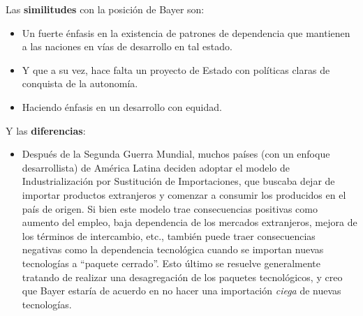  Las \textbf{similitudes} con la posición de Bayer son:

 \begin{itemize}
     \item Un fuerte énfasis en la existencia de patrones de dependencia que mantienen a las naciones en vías de desarrollo en tal estado.
     \item Y que a su vez, hace falta un proyecto de Estado con políticas claras de conquista de la autonomía.
     \item Haciendo énfasis en un desarrollo con equidad.
 \end{itemize}

 Y las \textbf{diferencias}:

 \begin{itemize}
     \item Después de la Segunda Guerra Mundial, muchos países (con un enfoque desarrollista) de América Latina deciden adoptar el modelo de Industrialización por Sustitución de Importaciones, que buscaba dejar de importar productos extranjeros y comenzar a consumir los producidos en el país de origen. Si bien este modelo trae consecuencias positivas como aumento del empleo, baja dependencia de los mercados extranjeros, mejora de los términos de intercambio, etc., también puede traer consecuencias negativas como la dependencia tecnológica cuando se importan nuevas tecnologías a ``paquete cerrado''. Esto último se resuelve generalmente tratando de realizar una desagregación de los paquetes tecnológicos, y creo que Bayer estaría de acuerdo en no hacer una importación \textit{ciega} de nuevas tecnologías.

 \end{itemize}
